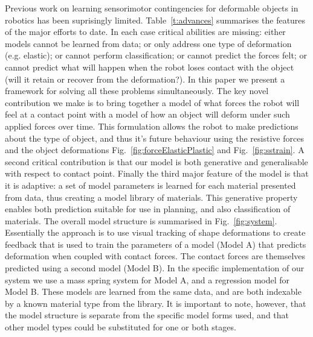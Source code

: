\documentclass[journal]{IEEEtran}
\newcommand{\fref}[1]{Fig.~\ref{#1}}
\newcommand{\alref}[1]{Algorithm~\ref{#1}}
\begin{document}
Previous work on learning sensorimotor contingencies for deformable objects in robotics has been suprisingly limited. Table~\ref{t:advances} summarises the features of the major efforts to date. In each case critical abilities are missing: either models cannot be learned from data; or only address one type of deformation (e.g. elastic); or cannot perform classification; or cannot predict the forces felt; or cannot predict what will happen when the robot loses contact with the object (will it retain or recover from the deformation?). In this paper we present a framework for solving all these problems simultaneously. The key novel contribution we make is to bring together a model of what forces the robot will feel at a contact point with a model of how an object will deform under such applied forces over time. This formulation allows the robot to make predictions about the type of object, and thus it's future behaviour using the resistive forces and the object deformations \fref{fig:forceElasticPlastic} and \fref{fig:sstrain}. A second critical contribution is that our model is both generative and generalisable with respect to contact point.  Finally the third major feature of the model is that it is adaptive: a set of model parameters is learned for each material presented from data, thus creating a model library of materials. This generative property enables both prediction suitable for use in planning, and also classification of materials. The overall model structure is summarised in \fref{fig:system}. Essentially the approach is to use visual tracking of shape deformations to create feedback that is used to train the parameters of a model (Model A) that predicts deformation when coupled with contact forces. The contact forces are themselves predicted using a second model (Model B). In the specific implementation of our system we use a mass spring system for Model A, and a regression model for Model B. These models are learned from the same data, and are both indexable by a known material type from the library. It is important to note, however, that the model structure is separate from the specific model forms used, and that other model types could be substituted for one or both stages.  %
\end{document}
